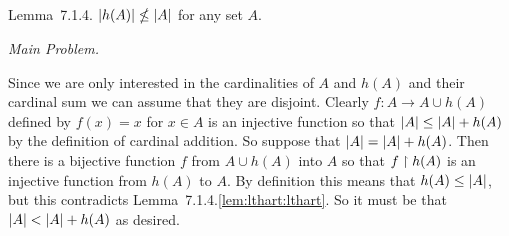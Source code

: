 \def\ex{7.1.4}
\setcounter{itm}{0}
\question{\ex}

\begin{solution}
    \begin{statement}{Lemma~\ex.}
    $\left| h(A) \right| \nleq \left| A \right|$ for any set $A$.
    \end{statement}


    \emph{Main Problem.}
    
	Since we are only interested in the cardinalities of $A$ and $h(A)$ and their cardinal sum we can assume that they are disjoint.
    Clearly $f: A \to A \cup h(A)$ defined by $f(x) = x$ for $x \in A$ is an injective function so that $\left| A \right| \leq \left| A \right| + h(A)$ by the definition of cardinal addition.
    So suppose that $\left| A \right| = \left| A \right| + h(A)$.
    Then there is a bijective function $f$ from $A \cup h(A)$ into $A$ so that $f \restriction h(A)$ is an injective function from $h(A)$ to $A$.
    By definition this means that $h(A) \leq \left| A \right|$, but this contradicts Lemma~\ex.\ref{lem:lthart:lthart}.
    So it must be that $\left| A \right| < \left| A \right| + h(A)$ as desired. \qedsymbol
\end{solution}


